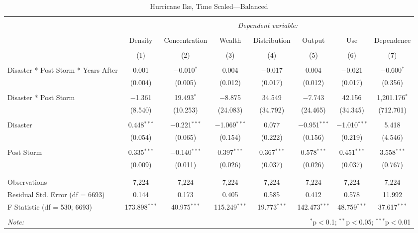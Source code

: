 
\begin{table}[!htbp] \centering 
  \caption{Hurricane Ike, Time Scaled---Balanced} 
  \label{} 
\footnotesize 
\begin{tabular}{@{\extracolsep{5pt}}lccccccc} 
\\[-1.8ex]\hline 
\hline \\[-1.8ex] 
 & \multicolumn{7}{c}{\textit{Dependent variable:}} \\ 
\cline{2-8} 
\\[-1.8ex] & Density & Concentration & Wealth & Distribution & Output & Use & Dependence \\ 
\\[-1.8ex] & (1) & (2) & (3) & (4) & (5) & (6) & (7)\\ 
\hline \\[-1.8ex] 
 Disaster * Post Storm * Years After & 0.001 & $-$0.010$^{*}$ & 0.004 & $-$0.017 & 0.004 & $-$0.021 & $-$0.600$^{*}$ \\ 
  & (0.004) & (0.005) & (0.012) & (0.017) & (0.012) & (0.017) & (0.356) \\ 
  & & & & & & & \\ 
 Disaster * Post Storm & $-$1.361 & 19.493$^{*}$ & $-$8.875 & 34.549 & $-$7.743 & 42.156 & 1,201.176$^{*}$ \\ 
  & (8.540) & (10.253) & (24.083) & (34.792) & (24.465) & (34.345) & (712.701) \\ 
  & & & & & & & \\ 
 Disaster & 0.448$^{***}$ & $-$0.221$^{***}$ & $-$1.069$^{***}$ & 0.077 & $-$0.951$^{***}$ & $-$1.010$^{***}$ & 5.418 \\ 
  & (0.054) & (0.065) & (0.154) & (0.222) & (0.156) & (0.219) & (4.546) \\ 
  & & & & & & & \\ 
 Post Storm & 0.335$^{***}$ & $-$0.140$^{***}$ & 0.397$^{***}$ & 0.367$^{***}$ & 0.578$^{***}$ & 0.451$^{***}$ & 3.558$^{***}$ \\ 
  & (0.009) & (0.011) & (0.026) & (0.037) & (0.026) & (0.037) & (0.767) \\ 
  & & & & & & & \\ 
\hline \\[-1.8ex] 
Observations & 7,224 & 7,224 & 7,224 & 7,224 & 7,224 & 7,224 & 7,224 \\ 
Residual Std. Error (df = 6693) & 0.144 & 0.173 & 0.405 & 0.585 & 0.412 & 0.578 & 11.992 \\ 
F Statistic (df = 530; 6693) & 173.898$^{***}$ & 40.975$^{***}$ & 115.249$^{***}$ & 19.773$^{***}$ & 142.473$^{***}$ & 48.759$^{***}$ & 37.617$^{***}$ \\ 
\hline 
\hline \\[-1.8ex] 
\textit{Note:}  & \multicolumn{7}{r}{$^{*}$p$<$0.1; $^{**}$p$<$0.05; $^{***}$p$<$0.01} \\ 
\end{tabular} 
\end{table} 
